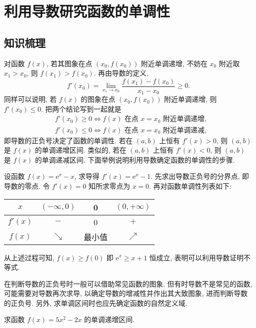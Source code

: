   \section{利用导数研究函数的单调性}

  \subsection{知识梳理}
  对函数 $f(x)$, 若其图象在点 $(x_0,f(x_0))$ 附近单调递增, 
  不妨在 $x_0$ 附近取 $x_1>x_0$, 则 $f(x_1)>f(x_0)$. 再由导数的定义,
  \[f'(x_0)= \lim_{x_1\to x_0} \frac{f(x_1)-f(x_0)}{x_1-x_0}\geqslant 0.\]
  同样可以说明, 若 $f(x)$ 的图象在点 $(x_0,f(x_0))$ 附近单调递增,
  则 $f'(x_0)\leqslant 0$. 把两个结论写到一起就是
  \begin{align*}
    &f'(x_0)\geqslant 0\iff \text{$f(x)$ 在点 $x=x_0$ 附近单调递增},\\
    &f'(x_0)\leqslant 0\iff \text{$f(x)$ 在点 $x=x_0$ 附近单调递减},
  \end{align*}
  即导数的正负号决定了函数的单调性. 若在 $(a,b)$ 上恒有 $f'(x)>0$, 
  则 $(a,b)$ 是 $f(x)$ 的单调递增区间. 类似的, 若在 $(a,b)$ 上恒有 $f'(x)<0$, 
  则 $(a,b)$ 是 $f(x)$ 的单调递减区间. 下面举例说明利用导数确定函数的单调性的步骤. 
  
  设函数 $f(x)=\mathrm{e}^x -x$, 求导得 $f'(x)= \mathrm{e}^x-1$. 
  先求出导数正负号的分界点, 即导数的零点. 令 $f'(x)=0$ 知所求零点为 $x=0$. 
  再对函数单调性列表如下:
  \begin{center}
    \small
    \begin{tabular}{c|ccc}
      $x$  & $(-\infty,0)$ & 0 & $(0,+\infty)$ \\
      \hline
      $f'(x)$ & $-$ & 0 & $+$ \\
      $f(x)$ & $\searrow$ & 最小值 & $\nearrow$
    \end{tabular}
  \end{center}
  从上述过程可知, $f(x)\geqslant f(0)$ 即 $\mathrm{e}^x\geqslant x+1$ 恒成立,
  表明可以利用导数证明不等式. 
  
  在判断导数的正负号时一般可以借助常见函数的图象.
  但有时导数不是常见的函数, 可能需要对导数再次求导, 以确定导数的增减性并作出其大致图象,
  进而判断导数的正负号. 另外, 求单调区间时也应先确定函数的自然定义域.
  

  \lianxi
  \begin{exercise}
    求函数 $f(x)=5x^2 -2x$ 的单调递增区间.
  \end{exercise}

